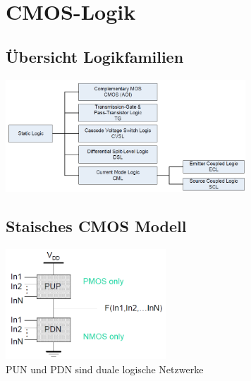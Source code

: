 \section{CMOS-Logik}
	\begin{multicols}{2}
		\subsection{\"Ubersicht Logikfamilien}
			\includegraphics[width=9cm]{images/cmosOverview.png}
		\subsection{Staisches CMOS Modell}
			\includegraphics[width=6cm]{images/cmosPrinzip.png}\\
			PUN und PDN sind duale logische Netzwerke\\
	\end{multicols}
